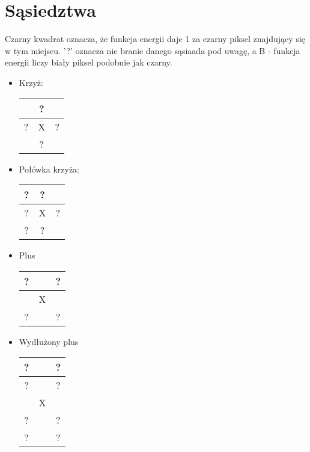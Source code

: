 \section{Sąsiedztwa}
Czarny kwadrat oznacza, że funkcja energii daje 1 za czarny piksel znajdujący się w tym miejscu. '?' oznacza nie branie danego sąsiaada pod uwagę, a B - funkcja energii liczy biały piksel podobnie jak czarny.
\begin{itemize}
    \item Krzyż:
    \begin{tabular}{|c|c|c|}
        \hline
        \cellcolor{black} & ? & \cellcolor{black}\\
        \hline
        ? & X & ?\\
        \hline
        \cellcolor{black} & ? & \cellcolor{black}\\
        \hline
    \end{tabular}
\item Połówka krzyża:
\begin{tabular}{|c|c|c|}
    \hline
    ? & ? & \cellcolor{black}\\
    \hline
    ? & X & ?\\
    \hline
    ? & ? & \cellcolor{black}\\
    \hline
\end{tabular}
\item Plus
\begin{tabular}{|c|c|c|}
    \hline
    ? & \cellcolor{black} & ? \\
    \hline
    \cellcolor{black} & X &\cellcolor{black}\\
    \hline
   ? &\cellcolor{black} &? \\
   \hline
\end{tabular}

\item Wydłużony plus
\begin{tabular}{|c|c|c|}
    \hline
    ? & \cellcolor{black} & ? \\
    \hline
    ? & \cellcolor{black} & ? \\
    \hline
    \cellcolor{black} & X & \cellcolor{black} \\
    \hline
    ? & \cellcolor{black} & ? \\
    \hline
    ? & \cellcolor{black} & ? \\
    \hline
    

\end{tabular}
\end{itemize}
